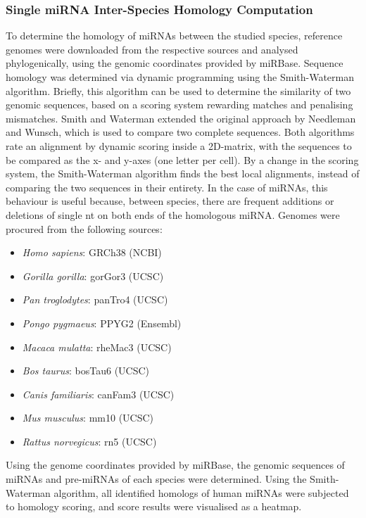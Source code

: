 \begin{method}
\subsubsection{Single miRNA Inter-Species Homology Computation}
To determine the homology of miRNAs between the studied species, reference genomes were downloaded from the respective sources and analysed phylogenically, using the genomic coordinates provided by miRBase. Sequence homology was determined via dynamic programming using the Smith-Waterman algorithm.\cite{Smith1981} Briefly, this algorithm can be used to determine the similarity of two genomic sequences, based on a scoring system rewarding matches and penalising mismatches. Smith and Waterman extended the original approach by Needleman and Wunsch,\cite{Needleman1970} which is used to compare two complete sequences. Both algorithms rate an alignment by dynamic scoring inside a 2D-matrix, with the sequences to be compared as the x- and y-axes (one letter per cell). By a change in the scoring system, the Smith-Waterman algorithm finds the best local alignments, instead of comparing the two sequences in their entirety. In the case of miRNAs, this behaviour is useful because, between species, there are frequent additions or deletions of single \ac{nt} on both ends of the homologous miRNA. Genomes were procured from the following sources:
\begin{itemize}[noitemsep, leftmargin=.5cm, label={\tiny\raisebox{1ex}{\textbullet}}]
\item \emph{Homo sapiens}: GRCh38 (NCBI)
\item \emph{Gorilla gorilla}: gorGor3 (UCSC)
\item \emph{Pan troglodytes}: panTro4 (UCSC)
\item \emph{Pongo pygmaeus}: PPYG2 (Ensembl)
\item \emph{Macaca mulatta}: rheMac3 (UCSC)
\item \emph{Bos taurus}: bosTau6 (UCSC)
\item \emph{Canis familiaris}: canFam3 (UCSC)
\item \emph{Mus musculus}: mm10 (UCSC)
\item \emph{Rattus norvegicus}: rn5 (UCSC)
\end{itemize}

Using the genome coordinates provided by miRBase, the genomic sequences of miRNAs and pre-miRNAs of each species were determined. Using the Smith-Waterman algorithm, all identified homologs of human miRNAs were subjected to homology scoring, and score results were visualised as a heatmap.

\end{method}

